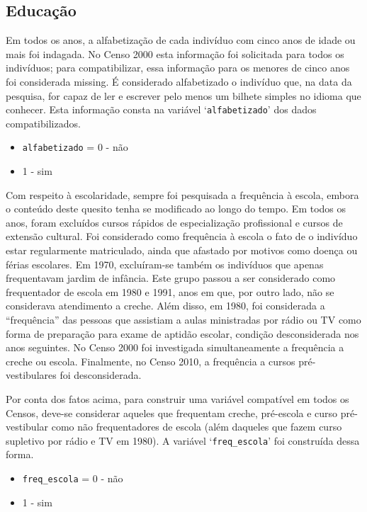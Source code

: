 \documentclass[12pt,a4paper]{article}
\newcommand{\vr}[1]{\texttt{#1}}
\begin{document}
\subsection{Educação}\label{sec:d8}
Em todos os anos, a alfabetização de cada indivíduo com cinco anos de idade ou mais foi indagada. No Censo 2000 esta informação foi solicitada para todos os indivíduos; para compatibilizar, essa informação para os menores de cinco anos foi considerada missing. É considerado alfabetizado o indivíduo que, na data da pesquisa, for capaz de ler e escrever pelo menos um bilhete simples no idioma que conhecer. Esta informação consta na variável ‘\vr{alfabetizado}’ dos dados compatibilizados.
\begin{itemize}
  \item \vr{alfabetizado} = 0 - não
  \item 1 - sim
\end{itemize}

Com respeito à escolaridade, sempre foi pesquisada a frequência à escola, embora o conteúdo deste quesito tenha se modificado ao longo do tempo. Em todos os anos, foram excluídos cursos rápidos de especialização profissional e cursos de extensão cultural. Foi considerado como frequência à escola o fato de o indivíduo estar regularmente matriculado, ainda que afastado por motivos como doença ou férias escolares. Em 1970, excluíram-se também os indivíduos que apenas frequentavam jardim de infância. Este grupo passou a ser considerado como frequentador de escola em 1980 e 1991, anos em que, por outro lado, não se considerava atendimento a creche. Além disso, em 1980, foi considerada a “frequência” das pessoas que assistiam a aulas ministradas por rádio ou TV como forma de preparação para exame de aptidão escolar, condição desconsiderada nos anos seguintes. No Censo 2000 foi investigada simultaneamente a frequência a creche ou escola. Finalmente, no Censo 2010, a frequência a cursos pré-vestibulares foi desconsiderada.

Por conta dos fatos acima, para construir uma variável compatível em todos os Censos, deve-se considerar aqueles que frequentam creche, pré-escola e curso pré-vestibular como não frequentadores de escola (além daqueles que fazem curso supletivo por rádio e TV em 1980). A variável ‘\vr{freq\_escola}’ foi construída dessa forma.
\begin{itemize}
  \item \vr{freq\_escola} = 0 - não
  \item 1 - sim
\end{itemize}
\end{document}
